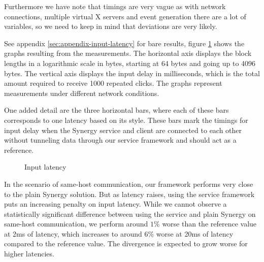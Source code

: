 Furthermore we have note that timings are very vague as with network connections, multiple virtual X servers and event generation there are a lot of variables, so we need to keep in mind that deviations are very likely.

See appendix \ref{sec:appendix-input-latency} for bare results, figure \ref{fig:input-latency} shows the graphs resulting from the measurements.
The horizontal axis displays the block lengths in a logarithmic scale in bytes, starting at 64 bytes and going up to 4096 bytes.
The vertical axis displays the input delay in milliseconds, which is the total amount required to receive 1000 repeated clicks.
The graphs represent measurements under different network conditions.

One added detail are the three horizontal bars, where each of these bars corresponds to one latency based on its style.
These bars mark the timings for input delay when the Synergy service and client are connected to each other without tunneling data through our service framework and should act as a reference.

\begin{figure}[t]
    \centering
    \caption{Input latency}
    \label{fig:input-latency}
\end{figure}


In the scenario of same-host communication, our framework performs very close to the plain Synergy solution.
But as latency raises, using the service framework puts an increasing penalty on input latency.
While we cannot observe a statistically significant difference between using the service and plain Synergy on same-host communication, we perform around $1\%$ worse than the reference value at 2ms of latency, which increases to around $6\%$ worse at 20ms of latency compared to the reference value.
The divergence is expected to grow worse for higher latencies.

